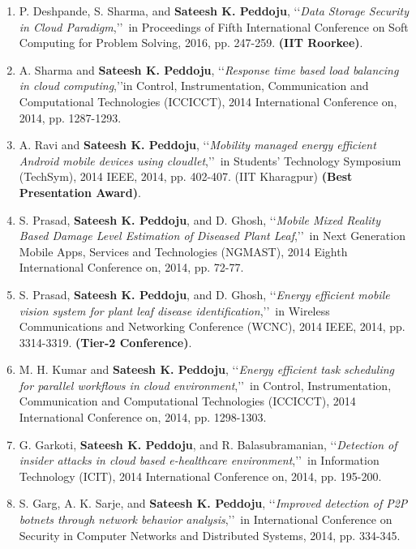 \begin{enumerate}
	\item
	P. Deshpande, S. Sharma, and \textbf{Sateesh K. Peddoju}, \lq\lq \textit{Data Storage Security in Cloud Paradigm},\rq\rq\, in Proceedings of Fifth International Conference on Soft Computing for Problem Solving, 2016, pp. 247-259. \textbf{ (IIT Roorkee)}.
	
	\item
	A. Sharma and \textbf{Sateesh K. Peddoju}, \lq\lq \textit{Response time based load balancing in cloud computing},\rq\rq in Control, Instrumentation, Communication and Computational Technologies (ICCICCT), 2014 International Conference on, 2014, pp. 1287-1293.
	
	\item
	A. Ravi and \textbf{Sateesh K. Peddoju}, \lq\lq \textit{Mobility managed energy efficient Android mobile devices using cloudlet},\rq\rq\, in Students' Technology Symposium (TechSym), 2014 IEEE, 2014, pp. 402-407. (IIT Kharagpur) \textbf{(Best Presentation Award)}.
	\item
	S. Prasad, \textbf{Sateesh K. Peddoju}, and D. Ghosh, \lq\lq \textit{Mobile Mixed Reality Based Damage Level Estimation of Diseased Plant Leaf},\rq\rq\, in Next Generation Mobile Apps, Services and Technologies (NGMAST), 2014 Eighth International Conference on, 2014, pp. 72-77.
	
	\item
	S. Prasad, \textbf{Sateesh K. Peddoju}, and D. Ghosh, \lq\lq \textit{Energy efficient mobile vision system for plant leaf disease identification},\rq\rq\, in Wireless Communications and Networking Conference (WCNC), 2014 IEEE, 2014, pp. 3314-3319. \textbf{(Tier-2 Conference)}.
	
	\item
	M. H. Kumar and \textbf{Sateesh K. Peddoju}, \lq\lq \textit{Energy efficient task scheduling for parallel workflows in cloud environment},\rq\rq\, in Control, Instrumentation, Communication and Computational Technologies (ICCICCT), 2014 International Conference on, 2014, pp. 1298-1303.
	
	\item
	G. Garkoti, \textbf{Sateesh K. Peddoju}, and R. Balasubramanian, \lq\lq \textit{Detection of insider attacks in cloud based e-healthcare environment},\rq\rq\, in Information Technology (ICIT), 2014 International Conference on, 2014, pp. 195-200.
	
	\item
	S. Garg, A. K. Sarje, and \textbf{Sateesh K. Peddoju}, \lq\lq \textit{Improved detection of P2P botnets through network behavior analysis},\rq\rq\, in International Conference on Security in Computer Networks and Distributed Systems, 2014, pp. 334-345.
	

\end{enumerate}
